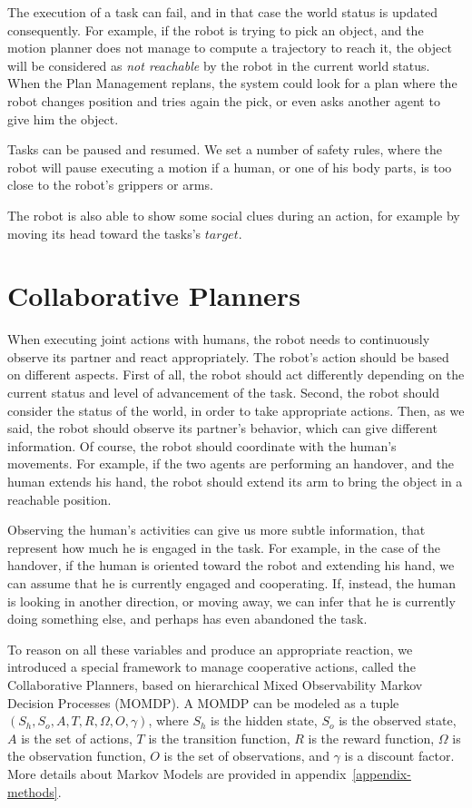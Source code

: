 The execution of a task can fail, and in that case the world status is updated consequently. For example, if the robot is trying to pick an object, and the motion planner does not manage to compute a trajectory to reach it, the object will be considered as \textit{not reachable} by the robot in the current world status. When the Plan Management replans, the system could look for a plan where the robot changes position and tries again the pick, or even asks another agent to give him the object.

Tasks can be paused and resumed. We set a number of safety rules, where the robot will pause executing a motion if a human, or one of his body parts, is too close to the robot's grippers or arms.

The robot is also able to show some social clues during an action, for example by moving its head toward the tasks's $target$. 

\section{Collaborative Planners} 
\label{sec:task_execution-collaborative_planners}
When executing joint actions with humans, the robot needs to continuously observe its partner and react appropriately. The robot's action should be based on different aspects. First of all, the robot should act differently depending on the current status and level of advancement of the task. Second, the robot should consider the status of the world, in order to take appropriate actions. Then, as we said, the robot should observe its partner's behavior, which can give different information. Of course, the robot should coordinate with the human's movements. For example, if the two agents are performing an handover, and the human extends his hand, the robot should extend its arm to bring the object in a reachable position.

Observing the human's activities can give us more subtle information, that represent how much he is engaged in the task. For example, in the case of the handover, if the human is oriented toward the robot and extending his hand, we can assume that he is currently engaged and cooperating. If, instead, the human is looking in another direction, or moving away, we can infer that he is currently doing something else, and perhaps has even abandoned the task.

To reason on all these variables and produce an appropriate reaction, we introduced a special framework to manage cooperative actions, called the Collaborative Planners, based on hierarchical Mixed Observability Markov Decision Processes (MOMDP). A MOMDP can be modeled as a tuple $(S_h,S_o,A,T,R,\Omega,O,\gamma)$, where $S_h$ is the hidden state, $S_o$ is the observed state, $A$ is the set of actions, $T$ is the transition function, $R$ is the reward function, $\Omega$ is the observation function, $O$ is the set of observations, and $\gamma$ is a discount factor. More details about Markov Models are provided in appendix~\ref{appendix-methods}.

